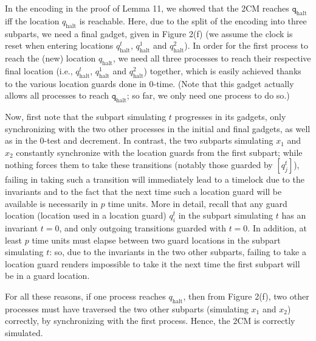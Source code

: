 \documentclass[10pt,a4paper]{article}
\begin{document}
 
 
In the encoding in the proof of Lemma 11, we showed that the 2CM reaches $\mathtt{q}_{\textrm{halt}}$ iff the location $q_{\textrm{halt}}$ is reachable. Here, due to the split of the encoding into three subparts, we need a final gadget, given in Figure 2(f) (we assume the clock is reset when entering locations $q_{\textrm{halt}}^{t}$, $q_{\textrm{halt}}^{1}$ and $q_{\textrm{halt}}^{2}$). In order for the first process to reach the (new) location $q_{\textrm{halt}}$, we need all three processes to reach their respective final location (i.e., $q_{\textrm{halt}}^{t}$, $q_{\textrm{halt}}^{1}$ and $q_{\textrm{halt}}^{2}$) together, which is easily achieved thanks to the various location guards done in 0-time. (Note that this gadget actually allows all processes to reach $\mathtt{q}_{\textrm{halt}}$; so far, we only need one process to do so.)\par
 
 
 
Now, first note that the subpart simulating $t$ progresses in its gadgets, only synchronizing with the two other processes in the initial and final gadgets, as well as in the 0-test and decrement. In contrast, the two subparts simulating $x_{1}$ and $x_{2}$ constantly synchronize with the location guards from the first subpart; while nothing forces them to take these transitions (notably those guarded by $[q_{j}^{t}]$), failing in taking such a transition will immediately lead to a timelock due to the invariants and to the fact that the next time such a location guard will be available is necessarily in $p$ time units. More in detail, recall that any guard location (location used in a location guard) $q_{i}^{t}$ in the subpart simulating $t$ has an invariant $t=0$, and only outgoing transitions guarded with $t=0$. In addition, at least $p$ time units must elapse between two guard locations in the subpart simulating $t$: so, due to the invariants in the two other subparts, failing to take a location guard renders impossible to take it the next time the first subpart will be in a guard location.\par
 
 
 
For all these reasons, if one process reaches $q_{\textrm{halt}}$, then from Figure 2(f), two other processes must have traversed the two other subparts (simulating $x_{1}$ and $x_{2}$) correctly, by synchronizing with the first process. Hence, the 2CM is correctly simulated.\par
 
\end{document}
